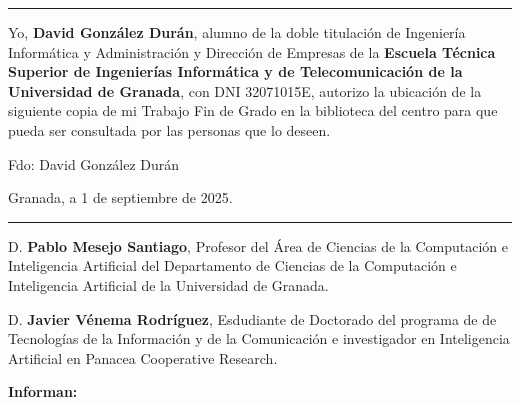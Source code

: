 
\cleardoublepage
\thispagestyle{empty}

\noindent\rule{\textwidth}{2pt}\par\vspace{4.5ex}

Yo, \textbf{David González Durán}, alumno de la doble titulación de Ingeniería Informática y Administración y Dirección de Empresas de la \textbf{Escuela Técnica Superior de Ingenierías Informática y de Telecomunicación de la Universidad de Granada}, con DNI 32071015E, autorizo la ubicación de la siguiente copia de mi Trabajo Fin de Grado en la biblioteca del centro para que pueda ser consultada por las personas que lo deseen.

\vspace{6cm}

\noindent Fdo: David González Durán

\vspace{2cm}

\begin{flushright}
    Granada, a 1 de septiembre de 2025.
\end{flushright}


\cleardoublepage
\thispagestyle{empty}

\noindent\rule{\textwidth}{2pt}\par\vspace{4.5ex}

D. \textbf{Pablo Mesejo Santiago}, Profesor del Área de Ciencias de la Computación e Inteligencia Artificial del Departamento de Ciencias de la Computación e Inteligencia Artificial de la Universidad de Granada.

\vspace{0.5cm}

D. \textbf{Javier Vénema Rodríguez}, Esdudiante de Doctorado del programa de de Tecnologías de la Información y de la Comunicación e investigador en Inteligencia Artificial en Panacea Cooperative Research.

\vspace{0.5cm}

\textbf{Informan:}

\vspace{0.5cm}


